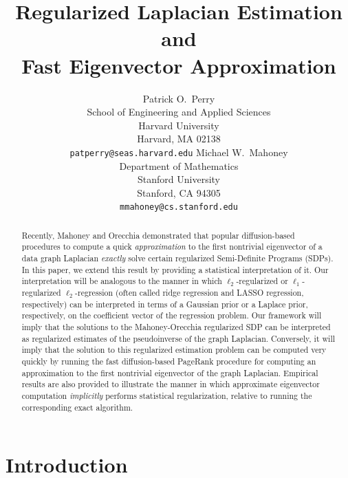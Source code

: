 \documentclass[12pt]{article}
\title{
  Regularized Laplacian Estimation
  and \\ Fast Eigenvector Approximation
}
\author{
  Patrick O.~Perry \\
  School of Engineering and Applied Sciences \\
  Harvard University \\
  Harvard, MA 02138 \\
  \texttt{patperry@seas.harvard.edu} 
  \And
  Michael W.~Mahoney \\
  Department of Mathematics \\
  Stanford University \\
  Stanford, CA 94305  \\
  \texttt{mmahoney@cs.stanford.edu}
}
\theoremstyle{plain}
\begin{document}
\maketitle

\begin{abstract}
Recently, Mahoney and Orecchia demonstrated that popular diffusion-based 
procedures to compute a quick \emph{approximation} to the first nontrivial 
eigenvector of a data graph Laplacian \emph{exactly} solve certain 
regularized Semi-Definite Programs (SDPs). 
In this paper, we extend this result by providing a statistical 
interpretation of it.
Our interpretation will be analogous to the manner in which
$\ell_2$-regularized or $\ell_1$-regularized $\ell_2$-regression (often
called ridge regression and LASSO regression, respectively) can be
interpreted in terms of a Gaussian prior or a Laplace prior, respectively,
on the coefficient vector of the regression problem.
Our framework will imply that the solutions to the Mahoney-Orecchia 
regularized SDP can be interpreted as regularized estimates of the 
pseudoinverse of the graph Laplacian.
Conversely, it will imply that the solution to this regularized estimation 
problem can be computed very quickly by running the fast diffusion-based 
PageRank procedure for computing an approximation to the first nontrivial 
eigenvector of the graph Laplacian.
Empirical results are also provided to illustrate the manner in which 
approximate eigenvector computation \emph{implicitly} performs statistical 
regularization, relative to running the corresponding exact algorithm.
\end{abstract}



\section{Introduction}
\label{sxn:intro}
\end{document}
